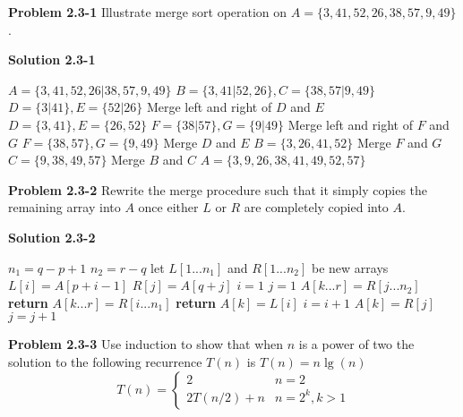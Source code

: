 \documentclass{article}
\begin{document}
\textbf{Problem 2.3-1} Illustrate merge sort operation on $A = \{3, 41, 52, 26, 38, 57, 9, 49\}$.

\medskip

\textbf{Solution 2.3-1}

\begin{algorithm}
\begin{algorithmic}[1]
\State $A = \{3, 41, 52, 26 | 38, 57, 9, 49\}$
\State $B = \{3, 41 | 52, 26 \}, C = \{38, 57 | 9, 49\}$
\State $D = \{3 | 41 \}, E = \{ 52 | 26\}$
\State Merge left and right of $D$ and $E$
\State $D = \{3, 41 \}, E = \{26, 52\}$
\State $F = \{38 | 57 \}, G = \{ 9 | 49\}$
\State Merge left and right of $F$ and $G$
\State $F = \{38, 57 \}, G = \{ 9, 49\}$
\State Merge $D$ and $E$
\State $B = \{3, 26, 41, 52 \}$
\State Merge $F$ and $G$
\State $C = \{9, 38, 49, 57 \}$
\State Merge $B$ and $C$
\State $A = \{3, 9, 26, 38, 41, 49, 52, 57\}$
\end{algorithmic}
\end{algorithm}

\hrulefill

\medskip

\textbf{Problem 2.3-2} Rewrite the merge procedure such that it simply copies the remaining array into $A$ once either $L$ or $R$ are completely copied into $A$.

\medskip

\textbf{Solution 2.3-2}

\begin{algorithm}
\begin{algorithmic}[1]
\State $n_1 = q - p + 1$
\State $n_2 = r - q$
\State let $L[1...n_1]$ and $R[1...n_2]$ be new arrays
	\State $L[i] = A[p+i-1]$
\EndFor
{}
	\State $R[j] = A[q+j]$
\EndFor
\State $i = 1$
\State $j = 1$
		\State $A[k ... r] = R[j...n_2]$
		\State \textbf{return}
	\EndIf
		\State $A[k ... r] = R[i...n_1]$
		\State \textbf{return}
	\EndIf
		\State $A[k] = L[i]$
		\State $i = i + 1$
	\Else
		\State $A[k] = R[j]$
		\State $j = j + 1$
	\EndIf
\EndFor
\EndProcedure
\end{algorithmic}
\end{algorithm}

\hrulefill

\medskip

\textbf{Problem 2.3-3} Use induction to show that when $n$ is a power of two the solution to the following recurrence $T(n)$ is $T(n) = n\lg(n)$
\[ T(n) = 
\begin{cases} 
	2 & n = 2 \\
    2T(n/2) + n & n = 2^k, k > 1
\end{cases}
\]
\end{document}
